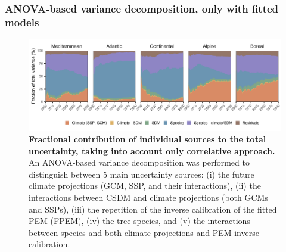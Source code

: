 \subsubsection{ANOVA-based variance decomposition, only with fitted models}

\begin{figure}[htpb]
\centering
\includegraphics{chapter4/figs/anova_across_species_byecoregion_onlyhybrid-1.pdf}
\caption{\textbf{Fractional contribution of individual sources to the total uncertainty, taking into account only correlative approach.} An ANOVA-based variance decomposition was performed to distinguish between 5 main uncertainty sources: (i) the future climate projections (GCM, SSP, and their interactions), (ii) the interactions between CSDM and climate projections (both GCMs and SSPs), (iii) the repetition of the inverse calibration of the fitted PEM (FPEM), (iv) the tree species, and (v) the interactions between species and both climate projections and PEM inverse calibration.}
\end{figure}

